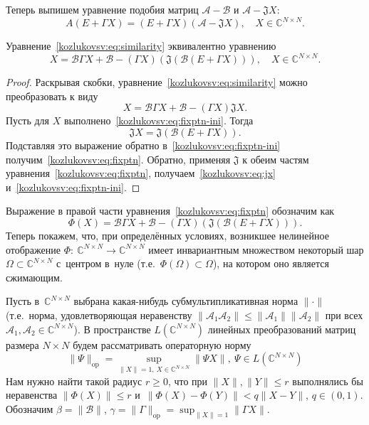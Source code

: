 Теперь выпишем уравнение подобия матриц \( \mathcal{A} - \mathcal{B} \)
и \( \mathcal{A} - \mathfrak{J} X \):
\begin{equation}\label{kozlukovsv:eq:similarity}
    A(E+\Gamma X) = (E+\Gamma X)(\mathcal{A} - \mathfrak{J} X), \quad X\in\mathbb{C}^{N{\times}N}.
\end{equation}
\begin{ksvlem}
    Уравнение~\eqref{kozlukovsv:eq:similarity} эквивалентно уравнению
    \begin{equation}\label{kozlukovsv:eq:fixptn}
        X = \mathcal{B} \Gamma X + \mathcal{B} - (\Gamma X)(\mathfrak{J}(\mathcal{B} (E + \Gamma X))), \quad X\in\mathbb{C}^{N{\times}N}.
    \end{equation}
\end{ksvlem}
\begin{proof}
Раскрывая скобки, уравнение~\eqref{kozlukovsv:eq:similarity} можно преобразовать к виду
\begin{equation}\label{kozlukovsv:eq:fixptn-ini}
    X = \mathcal{B} \Gamma X + \mathcal{B} - (\Gamma X) \mathfrak{J} X.
\end{equation}
Пусть для \( X \) выполнено~\eqref{kozlukovsv:eq:fixptn-ini}.
Тогда
    \begin{equation}\label{kozlukovsv:eq:jx}
        \mathfrak{J} X = \mathfrak{J}(\mathcal{B} (E + \Gamma X)).
    \end{equation}
Подставляя это выражение обратно в~\eqref{kozlukovsv:eq:fixptn-ini}
    получим~\eqref{kozlukovsv:eq:fixptn}.
Обратно, применяя \( \mathfrak{J} \) к обеим частям уравнения~\eqref{kozlukovsv:eq:fixptn},
    получаем~\eqref{kozlukovsv:eq:jx} и~\eqref{kozlukovsv:eq:fixptn-ini}.
\end{proof}

Выражение в правой части уравнения~\eqref{kozlukovsv:eq:fixptn} обозначим как
\[
    \Phi(X) = \mathcal{B} \Gamma X + \mathcal{B} - (\Gamma X)(\mathfrak{J}(\mathcal{B} (E + \Gamma X))).\]
Теперь покажем, что, при определ\"енных условиях,
возникшее нелинейное отображение
\( \Phi{:}\ \mathbb{C}^{N{\times}N}{\to}\mathbb{C}^{N{\times}N} \) имеет инвариантным множеством
некоторый шар \( \Omega \subset \mathbb{C}^{N{\times}N} \) с~центром в~нуле
(т.е.~\( \Phi(\Omega)\subset\Omega \)),
на котором оно является сжимающим.

Пусть в~\( \mathbb{C}^{N{\times}N} \)
выбрана какая-нибудь субмультипликативная норма \( \|\cdot\| \)
(т.е.~норма, удовлетворяющая неравенству
 \( \| \mathcal{A}_1\mathcal{A}_2 \| \leq \|\mathcal{A}_1\|\|\mathcal{A}_2\| \)
 при всех \( \mathcal{A}_1, \mathcal{A}_2 \in \mathbb{C}^{N{\times}N} \)).
В пространстве \( L(\mathbb{C}^{N{\times}N}) \)
  линейных преобразований матриц размера \( N{\times}N \)
  будем рассматривать операторную норму
  \[
      \|\Psi\|_{\mathrm{op}} = \sup_{\|X\|=1,\ X\in\mathbb{C}^{N{\times}N}} \|\Psi X\|,\ \Psi\in L(\mathbb{C}^{N{\times}N})
      \]
Нам нужно найти такой радиус \( r \geq 0 \),
что при \( \|X\|,\|Y\| \leq r \) выполнялись бы неравенства \( \|\Phi(X)\| \leq r \)
и~\( \|\Phi(X) - \Phi(Y)\| < q\|X-Y\| \), \( q\in(0,1) \).
Обозначим
\( \beta = \|\mathcal{B}\| \), \( \gamma = \|\Gamma\|_{\mathrm{op}} = \sup_{\|X\|=1} \|\Gamma X\| \).


